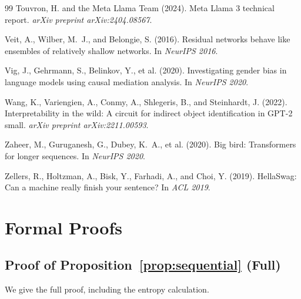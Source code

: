 \documentclass{article}
\begin{document}
\begin{thebibliography}{99}
Touvron, H. and the Meta Llama Team (2024).
Meta Llama 3 technical report.
\emph{arXiv preprint arXiv:2404.08567}.

Veit, A., Wilber, M.~J., and Belongie, S. (2016).
Residual networks behave like ensembles of relatively shallow networks.
In \emph{NeurIPS 2016}.

Vig, J., Gehrmann, S., Belinkov, Y., et al. (2020).
Investigating gender bias in language models using causal mediation analysis.
In \emph{NeurIPS 2020}.

Wang, K., Variengien, A., Conmy, A., Shlegeris, B., and Steinhardt, J. (2022).
Interpretability in the wild: A circuit for indirect object identification in GPT-2 small.
\emph{arXiv preprint arXiv:2211.00593}.

Zaheer, M., Guruganesh, G., Dubey, K.~A., et al. (2020).
Big bird: Transformers for longer sequences.
In \emph{NeurIPS 2020}.

Zellers, R., Holtzman, A., Bisk, Y., Farhadi, A., and Choi, Y. (2019).
HellaSwag: Can a machine really finish your sentence?
In \emph{ACL 2019}.

\end{thebibliography}

\appendix

\section{Formal Proofs}
\label{app:proofs}

\subsection{Proof of Proposition~\ref{prop:sequential} (Full)}

We give the full proof, including the entropy calculation.
\end{document}
